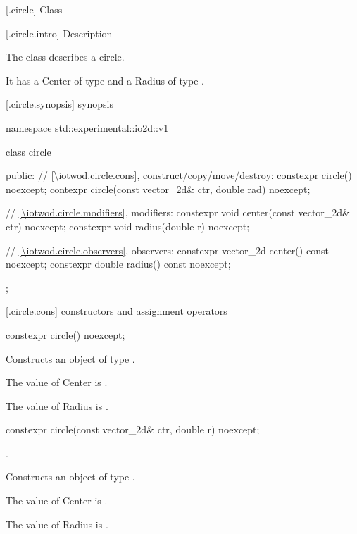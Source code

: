  [\iotwod.circle] {Class }

 [\iotwod.circle.intro] { Description}

\pnum
{}%
The class  describes a circle.

\pnum
It has a Center of type  and a Radius of type .

 [\iotwod.circle.synopsis] { synopsis}

\begin{codeblock}
namespace std::experimental::io2d::v1 {
  class circle {
  public:
    // \ref{\iotwod.circle.cons}, construct/copy/move/destroy:
    constexpr circle() noexcept;
    contexpr circle(const vector_2d& ctr, double rad) noexcept;

    // \ref{\iotwod.circle.modifiers}, modifiers:
    constexpr void center(const vector_2d& ctr) noexcept;
    constexpr void radius(double r) noexcept;
    
    // \ref{\iotwod.circle.observers}, observers:
    constexpr vector_2d center() const noexcept;
    constexpr double radius() const noexcept;
  };
}
\end{codeblock}

 [\iotwod.circle.cons] { constructors and assignment operators}

%
\begin{itemdecl}
constexpr circle() noexcept;
\end{itemdecl}
\begin{itemdescr}
\pnum
\effects
Constructs an object of type .

\pnum
The value of Center is .

\pnum
The value of Radius is .
\end{itemdescr}

%
\begin{itemdecl}
constexpr circle(const vector_2d& ctr, double r) noexcept;
\end{itemdecl}
\begin{itemdescr}
\requires
{}.

\pnum
\effects
Constructs an object of type .

\pnum
The value of Center is .

\pnum
The value of Radius is .
\end{itemdescr}

